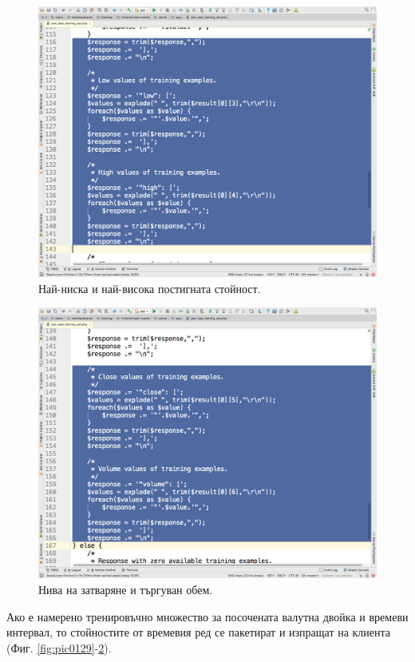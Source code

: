 \documentclass[book,14pt,oneside,openany]{memoir}
\begin{document}
\begin{figure}[h]
  \centering
  \includegraphics[height=0.45\pdfpageheight]{pic0130}
  \caption{Най-ниска и най-висока постигната стойност.}
\label{fig:pic0130}
\end{figure}
\FloatBarrier

\begin{figure}[h]
  \centering
  \includegraphics[height=0.45\pdfpageheight]{pic0131}
  \caption{Нива на затваряне и търгуван обем.}
\label{fig:pic0131}
\end{figure}
\FloatBarrier

Ако е намерено тренировъчно множество за посочената валутна двойка и времеви интервал, то стойностите от времевия ред се пакетират и изпращат на клиента (Фиг. \ref{fig:pic0129}-\ref{fig:pic0131}).
\end{document}

